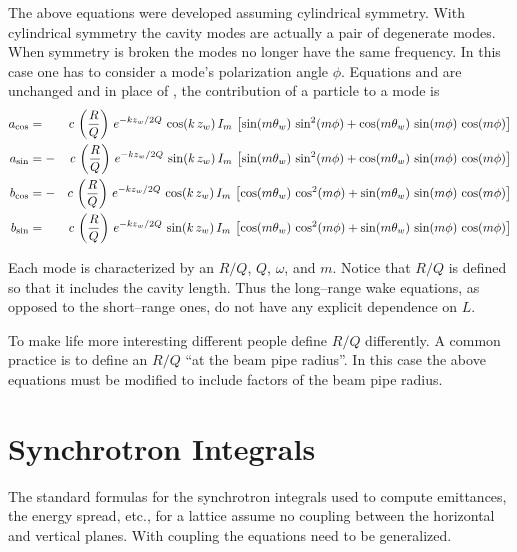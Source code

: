 The above equations were developed assuming cylindrical symmetry. With
cylindrical symmetry the cavity modes are actually a pair of
degenerate modes. When symmetry is broken the modes no longer have the
same frequency. In this case one has to consider a mode's polarization
angle $\phi$. Equations  and  are unchanged and
in place of , the contribution of a particle to a mode is
\begin{alignat}{2}
  a_{\cos} &=  &c \, \left( \frac{R}{Q} \right) \,
    e^{-k z_w/ 2 Q} \, \cos (k \, z_w) \, I_m \, \left[ 
    \sin(m \theta_w) \, \sin^2(m \phi) + 
    \cos(m \theta_w) \, \sin(m \phi) \, \cos(m\phi) \right]
    \nonumber \\
  a_{\sin} &= -&c \, \left( \frac{R}{Q} \right) \,
    e^{-k z_w/ 2 Q} \, \sin (k \, z_w) \, I_m \, \left[
    \sin(m \theta_w) \, \sin^2(m \phi) + 
    \cos(m \theta_w) \, \sin(m \phi) \, \cos(m\phi) \right]
    \\
  b_{\cos} &= -&c \, \left( \frac{R}{Q} \right) \,
    e^{-k z_w/ 2 Q} \, \cos (k \, z_w) \, I_m \, \left[
    \cos(m \theta_w) \, \cos^2(m \phi) + 
    \sin(m \theta_w) \, \sin(m \phi) \, \cos(m\phi) \right]
    \nonumber \\
  b_{\sin} &=  &c \, \left( \frac{R}{Q} \right) \,
    e^{-k z_w/ 2 Q} \, \sin (k \, z_w) \, I_m \, \left[
    \cos(m \theta_w) \, \cos^2(m \phi) + 
    \sin(m \theta_w) \, \sin(m \phi) \, \cos(m\phi) \right]
    \nonumber
\end{alignat}

Each mode is characterized by an $R/Q$, $Q$, $\omega$, and $m$. Notice
that $R/Q$ is defined so that it includes the cavity length. Thus the
long--range wake equations, as opposed to the short--range ones, do
not have any explicit dependence on $L$. 

To make life more interesting different people define $R/Q$
differently. A common practice is to define an $R/Q$ ``at the beam
pipe radius''. In this case the above equations must be modified to
include factors of the beam pipe radius.

\section{Synchrotron Integrals}
\label{s:synch.ints}

The standard formulas for the synchrotron integrals used to compute
emittances, the energy spread, etc., for a lattice assume no
coupling between the horizontal and vertical
planes\cite{b:helm,b:jowett}.  With coupling the equations need to be
generalized.

